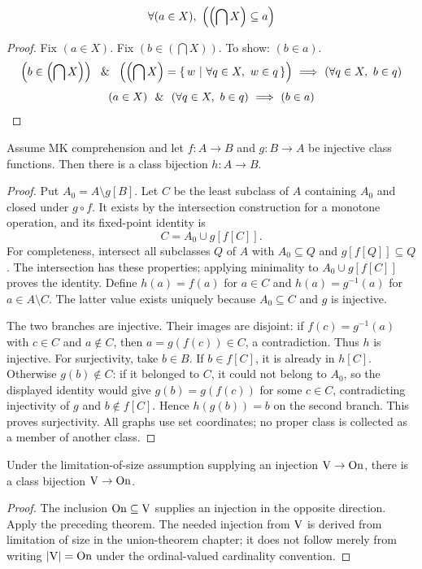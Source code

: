 \begin{lemma}
\[
\forall (a\in X),\ \left(\left(\bigcap X\right)\subseteq a\right)
\]
\end{lemma}
\begin{proof}
Fix $(a\in X)$. Fix $(b\in (\bigcap X))$. To show: $(b\in a)$.
\[
\left(b\in \left(\bigcap X\right)\right)
\ \ \&\ \ 
\left(\left(\bigcap X\right) = \left\{\,w\ \middle|\ \forall q\in X,\ w\in q\,\right\}\right)
\ \Longrightarrow\ 
\left(\forall q\in X,\ b\in q\right)
\]
\[
(a\in X)
\ \ \&\ \ 
(\forall q\in X,\ b\in q)
\ \Longrightarrow\ 
(b\in a)
\]
\end{proof}



\begin{theorem}
Assume MK comprehension and let $f:A\to B$ and $g:B\to A$ be
injective class functions. Then there is a class bijection $h:A\to B$.
\end{theorem}
\begin{proof}
Put $A_0=A\setminus g[B]$. Let $C$ be the least subclass of $A$
containing $A_0$ and closed under $g\circ f$. It exists by the
intersection construction for a monotone operation, and its fixed-point
identity is
\[
C=A_0\cup g[f[C]].
\]
For completeness, intersect all subclasses $Q$ of $A$ with
$A_0\subseteq Q$ and $g[f[Q]]\subseteq Q$. The intersection has these
properties; applying minimality to $A_0\cup g[f[C]]$ proves the identity.
Define $h(a)=f(a)$ for $a\in C$ and $h(a)=g^{-1}(a)$ for
$a\in A\setminus C$. The latter value exists uniquely because
$A_0\subseteq C$ and $g$ is injective.

The two branches are injective. Their images are disjoint: if
$f(c)=g^{-1}(a)$ with $c\in C$ and $a\notin C$, then
$a=g(f(c))\in C$, a contradiction. Thus $h$ is injective.
For surjectivity, take $b\in B$. If $b\in f[C]$, it is already in
$h[C]$. Otherwise $g(b)\notin C$: if it belonged to $C$, it could not
belong to $A_0$, so the displayed identity would give
$g(b)=g(f(c))$ for some $c\in C$, contradicting injectivity of $g$
and $b\notin f[C]$. Hence $h(g(b))=b$ on the second branch.
This proves surjectivity. All graphs use set coordinates; no proper
class is collected as a member of another class.
\end{proof}

\begin{corollary}
Under the limitation-of-size assumption supplying an injection
$\mathrm{V}\to\mathrm{On}$, there is a class bijection $\mathrm{V}\to\mathrm{On}$.
\end{corollary}
\begin{proof}
The inclusion $\mathrm{On}\subseteq\mathrm{V}$ supplies an injection in the opposite
direction. Apply the preceding theorem. The needed injection from
$\mathrm{V}$ is derived from limitation of size in the union-theorem chapter;
it does not follow merely from writing $|\mathrm{V}|=\mathrm{On}$ under the
ordinal-valued cardinality convention.
\end{proof}

